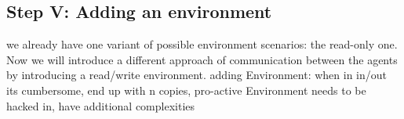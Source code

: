 \subsection{Step V: Adding an environment}
we already have one variant of possible environment scenarios: the read-only one. Now we will introduce a different approach of communication between the agents by introducing a read/write environment.
adding Environment: when in in/out its cumbersome, end up with n copies, pro-active Environment needs to be hacked in, have additional complexities